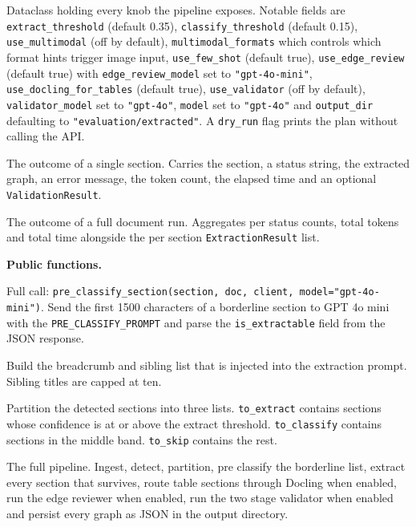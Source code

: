 \documentclass{article}
\begin{document}
\begin{description}[leftmargin=2em, style=nextline]
\item[\texttt{BatchConfig}]
Dataclass holding every knob the pipeline exposes. Notable fields are
\texttt{extract\_threshold} (default 0.35),
\texttt{classify\_threshold} (default 0.15),
\texttt{use\_multimodal} (off by default),
\texttt{multimodal\_formats} which controls which format hints
trigger image input,
\texttt{use\_few\_shot} (default true),
\texttt{use\_edge\_review} (default true) with
\texttt{edge\_review\_model} set to \texttt{"gpt-4o-mini"},
\texttt{use\_docling\_for\_tables} (default true),
\texttt{use\_validator} (off by default),
\texttt{validator\_model} set to \texttt{"gpt-4o"},
\texttt{model} set to \texttt{"gpt-4o"} and
\texttt{output\_dir} defaulting to
\texttt{"evaluation/extracted"}. A \texttt{dry\_run} flag prints the
plan without calling the API.
\item[\texttt{ExtractionResult}]
The outcome of a single section. Carries the section, a status string,
the extracted graph, an error message, the token count, the elapsed
time and an optional \texttt{ValidationResult}.
\item[\texttt{BatchResult}]
The outcome of a full document run. Aggregates per status counts,
total tokens and total time alongside the per section
\texttt{ExtractionResult} list.
\end{description}

\textbf{Public functions.}

\begin{description}[leftmargin=2em, style=nextline]
\item[\texttt{pre\_classify\_section}]
Full call:
\texttt{pre\_classify\_section(section,\allowbreak{} doc,\allowbreak{}
client,\allowbreak{} model="gpt-4o-mini")}.
Send the first 1500 characters of a borderline section to GPT 4o mini
with the \texttt{PRE\_CLASSIFY\_PROMPT} and parse the
\texttt{is\_extractable} field from the JSON response.
\item[\texttt{build\_toc\_context(section, detection)}]
Build the breadcrumb and sibling list that is injected into the
extraction prompt. Sibling titles are capped at ten.
\item[\texttt{plan\_batch(detection, config)}]
Partition the detected sections into three lists.
\texttt{to\_extract} contains sections whose confidence is at or
above the extract threshold. \texttt{to\_classify} contains sections
in the middle band. \texttt{to\_skip} contains the rest.
\item[\texttt{run\_batch(pdf\_path, config=None)}]
The full pipeline. Ingest, detect, partition, pre classify the
borderline list, extract every section that survives, route table
sections through Docling when enabled, run the edge reviewer when
enabled, run the two stage validator when enabled and persist every
graph as JSON in the output directory.
\end{description}
\end{document}
